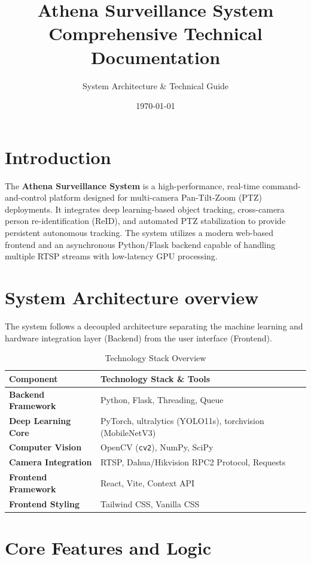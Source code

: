 \documentclass{article}
\title{Athena Surveillance System \\ \large Comprehensive Technical Documentation}
\author{System Architecture \& Technical Guide}
\date{\today}
\begin{document}
\maketitle

\tableofcontents
\newpage

\section{Introduction}
The \textbf{Athena Surveillance System} is a high-performance, real-time command-and-control platform designed for multi-camera Pan-Tilt-Zoom (PTZ) deployments. It integrates deep learning-based object tracking, cross-camera person re-identification (ReID), and automated PTZ stabilization to provide persistent autonomous tracking. The system utilizes a modern web-based frontend and an asynchronous Python/Flask backend capable of handling multiple RTSP streams with low-latency GPU processing.

\section{System Architecture overview}
The system follows a decoupled architecture separating the machine learning and hardware integration layer (Backend) from the user interface (Frontend).

\begin{table}[H]
    \centering
    \begin{tabularx}{\textwidth}{l|X}
        \toprule
        \textbf{Component} & \textbf{Technology Stack \& Tools} \\
        \midrule
        \textbf{Backend Framework} & Python, Flask, Threading, Queue \\
        \textbf{Deep Learning Core} & PyTorch, ultralytics (YOLO11s), torchvision (MobileNetV3) \\
        \textbf{Computer Vision} & OpenCV (\texttt{cv2}), NumPy, SciPy \\
        \textbf{Camera Integration} & RTSP, Dahua/Hikvision RPC2 Protocol, Requests \\
        \textbf{Frontend Framework} & React, Vite, Context API \\
        \textbf{Frontend Styling} & Tailwind CSS, Vanilla CSS \\
        \bottomrule
    \end{tabularx}
    \caption{Technology Stack Overview}
\end{table}

\section{Core Features and Logic}
\end{document}
